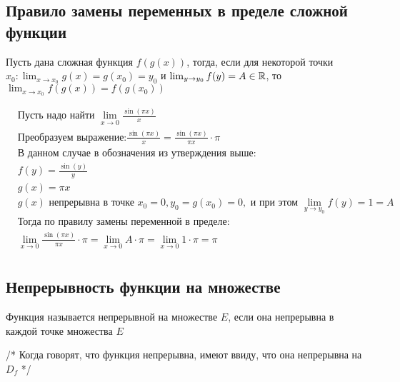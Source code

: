 \subsection{Правило замены переменных в пределе сложной функции}

{
    Пусть дана сложная функция $ f(g(x)) $, тогда, если для некоторой точки 
    $ x_0:  \lim_{x \to x_0} g(x) = g(x_0) = y_0 $ и $ \lim_{y \to y_0} f(y) = A \in \Rset $, то
    $ \lim_{x \to x_0} f(g(x)) = f(g(x_0)) $
}

{
\[\begin{split}
    & \text{Пусть надо найти } \lim_{x \to 0} \frac{\sin(\pi x)}{x} \\
    & \text{Преобразуем выражение:} \frac{\sin(\pi x)}{x} = \frac{\sin(\pi x)}{\pi x} \cdot \pi \\
    & \text{В данном случае в обозначения из утверждения выше:} \\
    & f(y) = \frac{\sin(y)}{y} \\ 
    & g(x) = \pi x \\
    & g(x) \text{ непрерывна в точке } x_0 = 0, y_0 = g(x_0) = 0, \text{ и при этом } \lim_{y \to y_0} f(y) = 1 = A \\
    & \text{Тогда по правилу замены переменной в пределе:} \\
    & \lim_{x \to 0} \frac{\sin(\pi x)}{\pi x} \cdot \pi = \lim_{x \to 0} A \cdot \pi = \lim_{x \to 0} 1 \cdot \pi = \pi \\
\end{split}\]
}

\subsection{Непрерывность функции на множестве}

{
    Функция называется непрерывной на множестве $E$, если она непрерывна в каждой точке множества $E$

    /* Когда говорят, что функция непрерывна, имеют ввиду, что она непрерывна на $D_f$ */
}


\pagebreak

